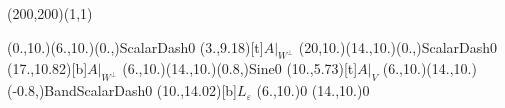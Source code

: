\unitlength=1bp%

\begin{feynartspicture}(200,200)(1,1)

\FADiagram{}
\FAProp(0.,10.)(6.,10.)(0.,){ScalarDash}{0}
\FALabel(3.,9.18)[t]{$A|_{W^\perp}$}
\FAProp(20,10.)(14.,10.)(0.,){ScalarDash}{0}
\FALabel(17.,10.82)[b]{$A|_{W^\perp}$}
\FAProp(6.,10.)(14.,10.)(0.8,){Sine}{0}
\FALabel(10.,5.73)[t]{$A|_V$}
\FAProp(6.,10.)(14.,10.)(-0.8,){BandScalarDash}{0}
\FALabel(10.,14.02)[b]{$L_\varepsilon$}
\FAVert(6.,10.){0}
\FAVert(14.,10.){0}
\end{feynartspicture}

